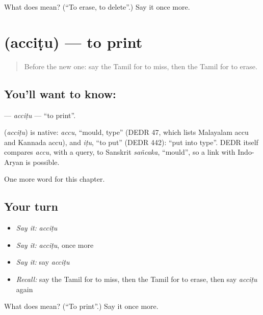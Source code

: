 \begin{tcolorbox}[breakable,colback=teal!4,colframe=teal!35!black,title={Before you move on}]
What does  mean? (\textquotedblleft{}To erase, to delete\textquotedblright{}.) Say it once more.
\end{tcolorbox}
\section[\texorpdfstring{\ta{அச்சிடு} (acciṭu)}{அச்சிடு (acciṭu)}]{ (acciṭu) — to print}

\label{lesson:TA-C256-accitu}



\begin{quote}
Before the new one: say the Tamil for to miss, then the Tamil for to erase.
\end{quote}

\subsection*{You'll want to know: }
\textbf{} — \emph{acciṭu} — \textquotedblleft{}to print\textquotedblright{}.

\begin{cousinweb}
\textbf{} (\emph{acciṭu}) is native: \emph{accu}, \textquotedblleft{}mould, type\textquotedblright{} (DEDR 47, which lists Malayalam accu and Kannada accu), and \emph{iṭu}, \textquotedblleft{}to put\textquotedblright{} (DEDR 442): \textquotedblleft{}put into type\textquotedblright{}. DEDR itself compares \emph{accu}, with a query, to Sanskrit \emph{sañcaka}, \textquotedblleft{}mould\textquotedblright{}, so a link with Indo-Aryan is possible.
\end{cousinweb}

\begin{grammarlens}[title={What you've built}]
One more word for this chapter.
\end{grammarlens}

\subsection*{Your turn}
\begin{itemize}
\raggedright
  \item \emph{Say it:} \emph{acciṭu}
  \item \emph{Say it:} \emph{acciṭu}, once more
  \item \emph{Say it:} say \emph{acciṭu}
  \item \emph{Recall:} say the Tamil for to miss, then the Tamil for to erase, then say \emph{acciṭu} again
\end{itemize}

\begin{tcolorbox}[breakable,colback=teal!4,colframe=teal!35!black,title={Before you move on}]
What does  mean? (\textquotedblleft{}To print\textquotedblright{}.) Say it once more.
\end{tcolorbox}
